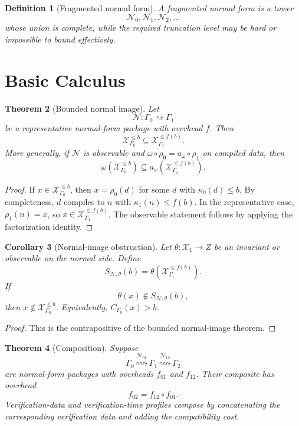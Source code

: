 \documentclass[11pt]{article}
\newtheorem{theorem}{Theorem}[section]
\newtheorem{corollary}[theorem]{Corollary}
\newtheorem{definition}[theorem]{Definition}
\begin{document}
\begin{definition}[Fragmented normal form]
A fragmented normal form is a tower
\[
\mathcal N_0,\mathcal N_1,\mathcal N_2,\ldots
\]
whose union is complete, while the required truncation level may be hard or impossible to bound effectively.
\end{definition}

\section{Basic Calculus}

\begin{theorem}[Bounded normal image]
Let
\[
\mathcal N:\Gamma_0\rightsquigarrow\Gamma_1
\]
be a representative normal-form package with overhead \(f\). Then
\[
\mathcal X_{\Gamma_0}^{\leq b}
\subseteq
\mathcal X_{\Gamma_1}^{\leq f(b)}.
\]
More generally, if \(\mathcal N\) is observable and \(\omega\circ\rho_0=a_\omega\circ\rho_1\) on compiled data, then
\[
\omega(\mathcal X_{\Gamma_0}^{\leq b})
\subseteq
a_\omega(\mathcal X_{\Gamma_1}^{\leq f(b)}).
\]
\end{theorem}

\begin{proof}
If \(x\in\mathcal X_{\Gamma_0}^{\leq b}\), then \(x=\rho_0(d)\) for some \(d\) with \(\kappa_0(d)\leq b\). By completeness, \(d\) compiles to \(n\) with \(\kappa_1(n)\leq f(b)\). In the representative case, \(\rho_1(n)=x\), so \(x\in\mathcal X_{\Gamma_1}^{\leq f(b)}\). The observable statement follows by applying the factorization identity.
\end{proof}

\begin{corollary}[Normal-image obstruction]
Let \(\theta:\mathcal X_1\to Z\) be an invariant or observable on the normal side. Define
\[
S_{\mathcal N,\theta}(b)=\theta(\mathcal X_{\Gamma_1}^{\leq f(b)}).
\]
If
\[
\theta(x)\notin S_{\mathcal N,\theta}(b),
\]
then \(x\notin\mathcal X_{\Gamma_0}^{\leq b}\). Equivalently, \(C_{\Gamma_0}(x)>b\).
\end{corollary}

\begin{proof}
This is the contrapositive of the bounded normal-image theorem.
\end{proof}

\begin{theorem}[Composition]
Suppose
\[
\Gamma_0
\overset{\mathcal N_{01}}{\rightsquigarrow}
\Gamma_1
\overset{\mathcal N_{12}}{\rightsquigarrow}
\Gamma_2
\]
are normal-form packages with overheads \(f_{01}\) and \(f_{12}\). Their composite has overhead
\[
f_{02}=f_{12}\circ f_{01}.
\]
Verification-data and verification-time profiles compose by concatenating the corresponding verification data and adding the compatibility cost.
\end{theorem}
\end{document}
